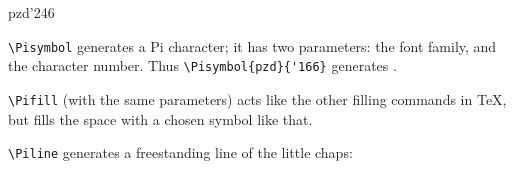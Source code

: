 \documentclass{article}
\begin{document}
\begin{Pilist}{pzd}{'246}
\item \verb|\Pisymbol| generates a Pi character; it has two
parameters: the font family, and the character number. Thus
\verb|\Pisymbol{pzd}{'166}| generates .
\item \verb|\Pifill| (with the same parameters)
 acts like the  other filling commands in \TeX, but fills the
space with a chosen symbol  like that.
\item \verb|\Piline| generates a freestanding line of the little chaps:
\end{Pilist}
\end{document}
